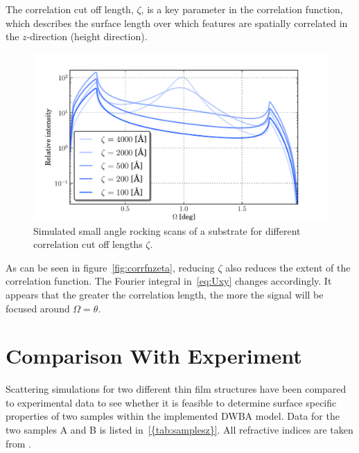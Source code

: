 \documentclass[10pt,twoside, b5paper,pdftex]{report}
\begin{document}
The correlation cut off length, $\zeta$, is a key parameter in the correlation function, which describes the surface length over which features are spatially correlated in the $z$-direction (height direction). 
\begin{figure}[htbp]
	\begin{center}
		\includegraphics[width=1.0\textwidth]{figures/var_zeta.pdf}
	\end{center}
	\caption{Simulated small angle rocking scans of a substrate for different correlation cut off lengths $\zeta$. \label{fig:var_zeta}}
\end{figure}
As can be seen in figure~\cref{fig:corrfnzeta}, reducing $\zeta$ also reduces the extent of the correlation function. The Fourier integral in~\cref{eq:Uxy} changes accordingly. It appears that the greater the correlation length, the more the signal will be focused around $\Omega = \theta$. 

%



\section{Comparison With Experiment \label{sec:fit}}
Scattering simulations for two different thin film structures have been compared to experimental data to see whether it is feasible to determine surface specific properties of two samples within the implemented DWBA model. Data for the two samples A and B is listed in~\cref{{tab:samplesz}}. All refractive indices are taken from \cite{HENKE}.
\end{document}
